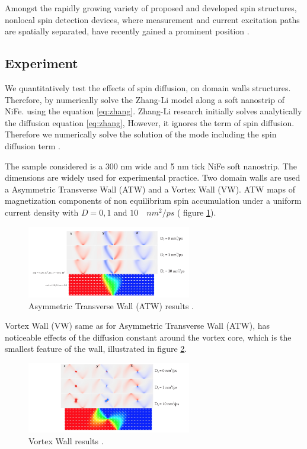 Amongst the rapidly growing variety of proposed and developed spin structures, nonlocal spin detection devices, where measurement and current excitation paths are spatially separated, have recently gained a prominent position \cite{spinz}.

\subsection{Experiment}

We quantitatively test the effects of spin diffusion, on domain walls structures. Therefore, by numerically solve the Zhang-Li model along a soft nanostrip of NiFe. using the equation \ref{eq:zhang}. Zhang-Li research initially solves analytically the diffusion equation \ref{eq:zhang}, However, it ignores the term of spin diffusion. Therefore we numerically solve the solution of the mode including the spin diffusion term \cite{zhang}.

The sample considered is a 300 nm wide and 5 nm tick NiFe soft nanostrip. The dimensions are widely used for experimental practice. Two domain walls are used a Asymmetric Transverse Wall (ATW) and a Vortex Wall (VW). ATW maps of magnetization components of non equilibrium spin accumulation under a uniform current density with $D = 0, 1$ and $10 \quad nm^2 / ps$ ( figure \ref{fig:atw}).

\begin{figure}[htbp]
	\centering
		\includegraphics[width=0.64\textwidth]{Figures/ATW.png}
		\smallskip
	\caption[Asymmetric Transverse Wall results]{Asymmetric Transverse Wall (ATW) results \cite{claudio}.}
	\label{fig:atw}
\end{figure}

Vortex Wall (VW) same as for Asymmetric Transverse Wall (ATW), has noticeable effects of the diffusion constant around the vortex core, which is the smallest feature of the wall, illustrated in figure \ref{fig:vw}.

\begin{figure}[htbp]
	\centering
		\includegraphics[width=0.64\textwidth]{Figures/VW.png}
		\smallskip
	\caption[Vortex Wall results]{Vortex Wall results \cite{claudio}. }
	\label{fig:vw}
\end{figure}

